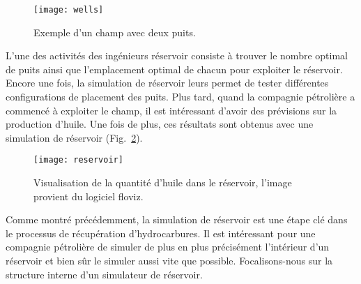 \begin{figure}[!h]
  \centering
  \texttt{[image: wells]}
  \caption{Exemple d'un champ avec deux puits.}
\label{fig:wells}
\end{figure}


L'une des activités des ingénieurs réservoir consiste à trouver le nombre optimal de puits ainsi que l'emplacement optimal de chacun pour exploiter le réservoir.
%
Encore une fois, la simulation de réservoir leurs permet de tester différentes configurations de placement des puits.
%
Plus tard, quand la compagnie pétrolière a commencé à exploiter le champ, il est intéressant d'avoir des prévisions sur la production d'huile.
%
Une fois de plus, ces résultats sont obtenus avec une simulation de réservoir (Fig.~\ref{fig:floviz}).

\begin{figure}[!h]
  \centering
  \texttt{[image: reservoir]}
  \caption{Visualisation de la quantité d'huile dans le réservoir, l'image provient du logiciel floviz.}
\label{fig:floviz}
\end{figure}

Comme montré précédemment, la simulation de réservoir est une étape clé dans le processus de récupération d'hydrocarbures.
%
Il est intéressant pour une compagnie pétrolière de simuler de plus en plus précisément l'intérieur d'un réservoir et bien sûr le simuler aussi vite que possible.
%
Focalisons-nous sur la structure interne d'un simulateur de réservoir.
